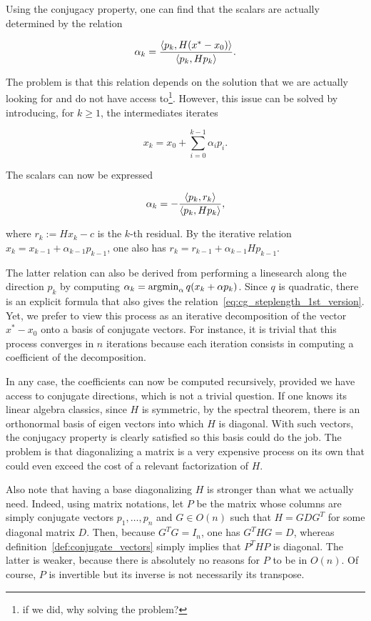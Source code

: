 \documentclass[10pt]{article}
\numberwithin{equation}{section}
\begin{document}
	Using the conjugacy property, one can find that the scalars are actually determined by the relation
	
	\[ \alpha_k = \dfrac{\left\langle {p_k} , {H(x^*-x_0)} \right\rangle}{\left\langle {p_k} , {Hp_k} \right\rangle}.\]
	
	The problem is that this relation depends on the solution that we are actually looking for and do not have access to\footnote{if we did, why solving the problem?}. However, this issue can be solved by introducing, for $k\ge 1$, the intermediates iterates 
	
	\[ x_k = x_0 + \sum_{i=0}^{k-1} \alpha_i p_i.\]
	
	The scalars can now be expressed
	
	\begin{equation}\label{eq:cg_steplength_1st_version}
		\alpha_k = -\dfrac{\left\langle {p_k} , {r_k} \right\rangle}{\left\langle {p_k} , {Hp_k} \right\rangle},
	\end{equation}
	
	where $r_k := Hx_k - c$ is the $k$-th residual. By the iterative relation $x_{k} = x_{k-1}+\alpha_{k-1}p_{k-1}$, one also has $r_{k}=r_{k-1} + \alpha_{k-1}Hp_{k-1}$.
	
	The latter relation can also be derived from performing a linesearch along the direction $p_k$ by computing $\alpha_k = \operatorname*{argmin}_\alpha q(x_k + \alpha p_k)$. Since $q$ is quadratic, there is an explicit formula that also gives the relation~\eqref{eq:cg_steplength_1st_version}. Yet, we prefer to view this process as an iterative decomposition of the vector $x^*-x_0$ onto a basis of conjugate vectors. For instance, it is trivial that this process converges in $n$ iterations because each iteration consists in computing a coefficient of the decomposition. 
	
	In any case, the coefficients can now be computed recursively, provided we have access to conjugate directions, which is not a trivial question. If one knows its linear algebra classics, since $H$ is symmetric, by the spectral theorem, there is an orthonormal basis of eigen vectors into which $H$ is diagonal. With such vectors, the conjugacy property is clearly satisfied so this basis could do the job. The problem is that diagonalizing a matrix is a very expensive process on its own that could even exceed the cost of a relevant factorization of $H$. 
	
	Also note that having a base diagonalizing $H$ is stronger than what we actually need. Indeed, using matrix notations, let $P$ be the matrix whose columns are simply conjugate vectors $p_1,\ldots,p_n$ and $G \in O(n)$ such that $H=GDG^T$ for some diagonal matrix $D$. Then, because $G^TG=I_n$, one has $G^THG=D$, whereas definition~\ref{def:conjugate_vectors} simply implies that $P^THP$ is diagonal. The latter is weaker, because there is absolutely no reasons for $P$ to be in $O(n)$. Of course, $P$ is invertible but its inverse is not necessarily its transpose. 
	
\end{document}
